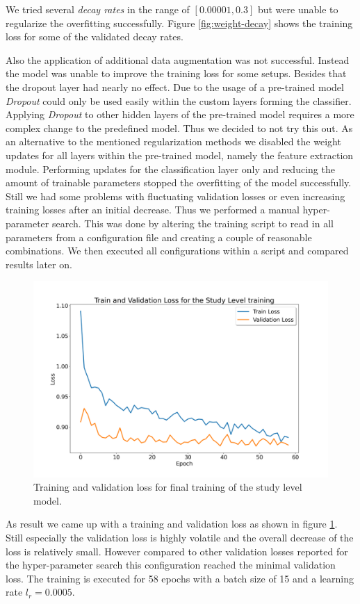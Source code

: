 We tried several \textit{decay rates} in the range of $[0.00001, 0.3]$ but were unable to regularize the overfitting successfully. Figure \vref{fig:weight-decay} shows the training loss for some of the validated decay rates.

Also the application of additional data augmentation was not successful. Instead the model was unable to improve the training loss for some setups. Besides that the dropout layer had nearly no effect. Due to the usage of a pre-trained model \textit{Dropout} could only be used easily within the custom layers forming the classifier. Applying \textit{Dropout} to other hidden layers of the pre-trained model requires a more complex change to the predefined model. Thus we decided to not try this out.
As an alternative to the mentioned regularization methods we disabled the weight updates for all layers within the pre-trained model, namely the feature extraction module. Performing updates for the classification layer only and reducing the amount of trainable parameters stopped the overfitting of the model successfully. Still we had some problems with fluctuating validation losses or even increasing training losses after an initial decrease. Thus we performed a manual hyper-parameter search. This was done by altering the training script to read in all parameters from a configuration file and creating a couple of reasonable combinations. We then executed all configurations within a script and compared results later on.

\begin{figure}[h!]
	\centering
	\includegraphics[width=.7\linewidth]{img/loss_study_level_ep58.png}
	\caption{Training and validation loss for final training of the study level model.}
	\label{fig:study-loss}
\end{figure}

As result we came up with a training and validation loss as shown in figure \ref{fig:study-loss}. Still especially the validation loss is highly volatile and the overall decrease of the loss is relatively small. However compared to other validation losses reported for the hyper-parameter search this configuration reached the minimal validation loss. The training is executed for 58 epochs with a batch size of 15 and a learning rate $l_r = 0.0005$.